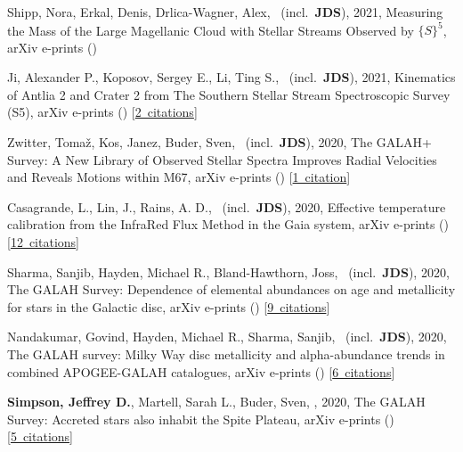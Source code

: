 \item[{\color{numcolor}\scriptsize10}] Shipp, Nora, Erkal, Denis, Drlica-Wagner, Alex, \etal\ (incl.\ \textbf{JDS}), 2021, Measuring the Mass of the Large Magellanic Cloud with Stellar Streams Observed by ${\{}S{\}}^5$, arXiv e-prints ()

\item[{\color{numcolor}\scriptsize9}] Ji, Alexander P., Koposov, Sergey E., Li, Ting S., \etal\ (incl.\ \textbf{JDS}), 2021, Kinematics of Antlia 2 and Crater 2 from The Southern Stellar Stream Spectroscopic Survey (S5), arXiv e-prints () [\href{https://ui.adsabs.harvard.edu/#abs/2021arXiv210612656J}{2~citations}]

\item[{\color{numcolor}\scriptsize8}] Zwitter, Toma{\v{z}}, Kos, Janez, Buder, Sven, \etal\ (incl.\ \textbf{JDS}), 2020, The GALAH+ Survey: A New Library of Observed Stellar Spectra Improves Radial Velocities and Reveals Motions within M67, arXiv e-prints () [\href{https://ui.adsabs.harvard.edu/#abs/2020arXiv201212201Z}{1~citation}]

\item[{\color{numcolor}\scriptsize7}] Casagrande, L., Lin, J., Rains, A. D., \etal\ (incl.\ \textbf{JDS}), 2020, Effective temperature calibration from the InfraRed Flux Method in the Gaia system, arXiv e-prints () [\href{https://ui.adsabs.harvard.edu/#abs/2020arXiv201102517C}{12~citations}]

\item[{\color{numcolor}\scriptsize6}] Sharma, Sanjib, Hayden, Michael R., Bland-Hawthorn, Joss, \etal\ (incl.\ \textbf{JDS}), 2020, The GALAH Survey: Dependence of elemental abundances on age and metallicity for stars in the Galactic disc, arXiv e-prints () [\href{https://ui.adsabs.harvard.edu/#abs/2020arXiv201113818S}{9~citations}]

\item[{\color{numcolor}\scriptsize5}] Nandakumar, Govind, Hayden, Michael R., Sharma, Sanjib, \etal\ (incl.\ \textbf{JDS}), 2020, The GALAH survey: Milky Way disc metallicity and alpha-abundance trends in combined APOGEE-GALAH catalogues, arXiv e-prints () [\href{https://ui.adsabs.harvard.edu/#abs/2020arXiv201102783N}{6~citations}]

\item[{\color{numcolor}\scriptsize4}] \textbf{Simpson, Jeffrey D.}, Martell, Sarah L., Buder, Sven, \etal, 2020, The GALAH Survey: Accreted stars also inhabit the Spite Plateau, arXiv e-prints () [\href{https://ui.adsabs.harvard.edu/#abs/2020arXiv201102659S}{5~citations}]

